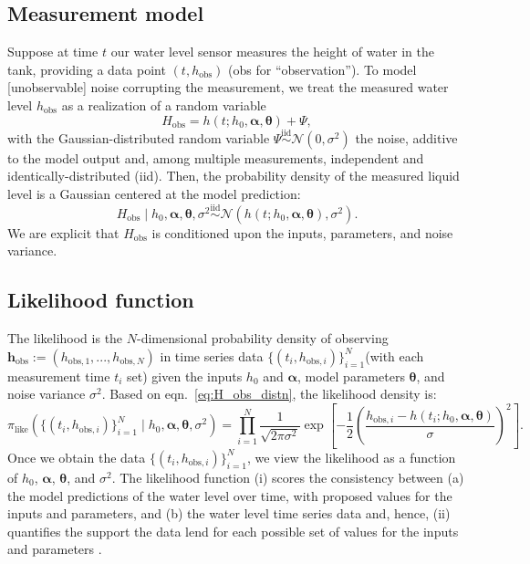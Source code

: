 \documentclass[openacc]{rsproca_new}%
\newcommand\thedata {$\{(t_i,h_{\text{obs}, i})\}_{i=1}^{N}$\xspace}
\newcommand\thedatanomath {\{(t_i,h_{\text{obs}, i})\}_{i=1}^{N}}
\newcommand\themodelnomath {h(t; h_0, \boldsymbol \alpha, \boldsymbol\theta)}
\begin{document}
\subsection{Measurement model}
Suppose at time $t$ our water level sensor measures the height of water in the tank, providing a data point $(t, h_{\text{obs}})$ (obs for ``observation''). 
To model [unobservable] noise corrupting the measurement, we treat the measured water level $h_{\text{obs}}$ as a realization of a random variable
\begin{equation}
	H_{\text{obs}} = \themodelnomath + \Psi,
\end{equation}
with the Gaussian-distributed random variable $\Psi \overset{\text{iid}}{\sim} \mathcal{N}(0, \sigma^2)$ the noise, additive to the model output and, among multiple measurements, independent and identically-distributed (iid). 
Then, the probability density of the measured liquid level is a Gaussian centered at the model prediction:
\begin{equation}
	H_{\text{obs}} \mid h_0, \boldsymbol \alpha, \boldsymbol  \theta, \sigma^2 \overset{\text{iid}}{\sim} \mathcal{N}(\themodelnomath, \sigma^2). \label{eq:H_obs_distn}
\end{equation} We are explicit that $H_{\text{obs}}$ is conditioned upon the inputs, parameters, and noise variance.


\subsection{Likelihood function}
The likelihood is the $N$-dimensional probability density of observing $\mathbf{h}_\text{obs}:=(h_{\text{obs},1}, ..., h_{\text{obs},N})$ in time series data \thedata (with each measurement time $t_i$ set) given the inputs $h_0$ and $\boldsymbol \alpha$, model parameters $\boldsymbol \theta$, and noise variance $\sigma^2$. 
Based on eqn.~\ref{eq:H_obs_distn}, the likelihood density is:
\begin{equation}
 \pi_{\text{like}}(\thedatanomath \mid h_0,\boldsymbol  \alpha, \boldsymbol \theta, \sigma^2 ) = \prod_{i=1}^N \frac{1}{\sqrt{2\pi\sigma^2}} \exp \left[-\frac{1}{2}\left(\frac{h_{\text{obs}, i} - h(t_i; h_0, \boldsymbol\alpha, \boldsymbol\theta)}{\sigma} \right)^2 \right]. \label{eq:like}
\end{equation}
Once we obtain the data \thedata, we view the likelihood as a function of $h_0$, $\boldsymbol \alpha$, $\boldsymbol \theta$, and $\sigma^2$.
The likelihood function (i) scores the consistency between (a) the model predictions of the water level over time, with proposed values for the inputs and parameters, and (b) the water level time series data and, hence, (ii) quantifies the support the data lend for each possible set of values for the inputs and parameters \cite{van2021bayesian}. 
\end{document}
